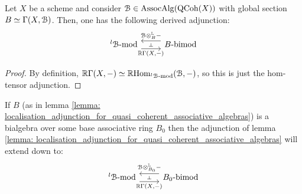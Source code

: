                 \begin{lemma} \label{lemma: localisation_adjunction_for_quasi_coherent_associative_algebras}
                    Let $X$ be a scheme and consider $\mathcal{B} \in \mathrm{Assoc}\mathrm{Alg}(\mathrm{QCoh}(X))$ with global section $B \simeq \Gamma(X, \mathcal{B})$. Then, one has the following derived adjunction:
                        $$
                            \begin{tikzcd}
                            	{{}^l\calB\mod} & {B\bimod}
                            	\arrow[""{name=0, anchor=center, inner sep=0}, "{\R\Gamma(X, -)}"', shift right=2, from=1-1, to=1-2]
                            	\arrow[""{name=1, anchor=center, inner sep=0}, "{\calB \tensor_B^{\L} -}"', shift right=2, from=1-2, to=1-1]
                            	\arrow["\dashv"{anchor=center, rotate=-90}, draw=none, from=1, to=0]
                            \end{tikzcd}
                        $$
                \end{lemma}
                    \begin{proof}
                        By definition, $\mathbb{R}\Gamma(X, -) \simeq \mathbb{R}\mathrm{Hom}_{{}^l\mathcal{B}\text{-}\mathrm{mod}}(\mathcal{B}, -)$, so this is just the hom-tensor adjunction.
                    \end{proof}
                \begin{corollary} \label{coro: localisation_adjunction_for_quasi_coherent_associative_algebras}
                    If $B$ (as in lemma \ref{lemma: localisation_adjunction_for_quasi_coherent_associative_algebras}) is a bialgebra over some  base associative ring $B_0$ then the adjunction of lemma \ref{lemma: localisation_adjunction_for_quasi_coherent_associative_algebras} will extend down to:
                        $$
                            \begin{tikzcd}
                            	{{}^l\calB\mod} & {B_0\bimod}
                            	\arrow[""{name=0, anchor=center, inner sep=0}, "{\R\Gamma(X, -)}"', shift right=2, from=1-1, to=1-2]
                            	\arrow[""{name=1, anchor=center, inner sep=0}, "{\calB \tensor_{B_0}^{\L} -}"', shift right=2, from=1-2, to=1-1]
                            	\arrow["\dashv"{anchor=center, rotate=-90}, draw=none, from=1, to=0]
                            \end{tikzcd}
                        $$
                \end{corollary}

